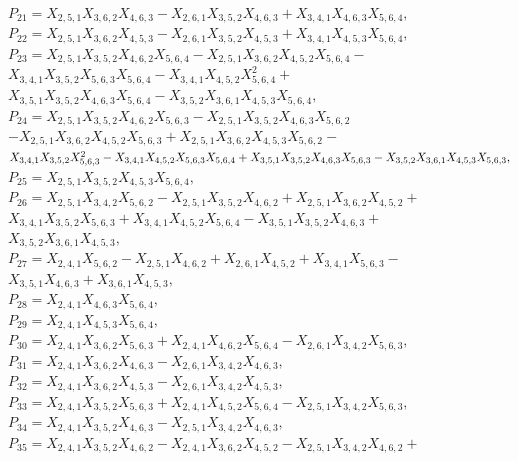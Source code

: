 \documentclass[10pt]{beamer}
\begin{document}
{$P_{21}=X_{2,5,1}X_{3,6,2}X_{4,6,3}-X_{2,6,1}X_{3,5,2}X_{4,6,3}+X_{3,4,1}X_{4,6,3}X_{5,6,4},$\\
$P_{22}=X_{2,5,1}X_{3,6,2}X_{4,5,3}-X_{2,6,1}X_{3,5,2}X_{4,5,3}+X_{3,4,1}X_{4,5,3}X_{5,6,4},$\\
$P_{23}=X_{2,5,1}X_{3,5,2}X_{4,6,2}X_{5,6,4}-X_{2,5,1}X_{3,6,2}X_{4,5,2}X_{5,6,4}-$\\
$X_{3,4,1}X_{3,5,2}X_{5,6,3}X_{5,6,4}-X_{3,4,1}X_{4,5,2}X_{5,6,4}^2+$\\
$X_{3,5,1}X_{3,5,2}X_{4,6,3}X_{5,6,4}-X_{3,5,2}X_{3,6,1}X_{4,5,3}X_{5,6,4},$\\
$P_{24}=X_{2,5,1}X_{3,5,2}X_{4,6,2}X_{5,6,3}-X_{2,5,1}X_{3,5,2}X_{4,6,3}X_{5,6,2}$\\
$-X_{2,5,1}X_{3,6,2}X_{4,5,2}X_{5,6,3}+X_{2,5,1}X_{3,6,2}X_{4,5,3}X_{5,6,2}-$\\
$X_{3,4,1}X_{3,5,2}X_{5,6,3}^2-X_{3,4,1}X_{4,5,2}X_{5,6,3}X_{5,6,4}+\\
X_{3,5,1}X_{3,5,2}X_{4,6,3}X_{5,6,3}-X_{3,5,2}X_{3,6,1}X_{4,5,3}X_{5,6,3},$\\
$P_{25}=X_{2,5,1}X_{3,5,2}X_{4,5,3}X_{5,6,4},$\\
$P_{26}=X_{2,5,1}X_{3,4,2}X_{5,6,2}-X_{2,5,1}X_{3,5,2}X_{4,6,2}+X_{2,5,1}X_{3,6,2}X_{4,5,2}+$\\
$X_{3,4,1}X_{3,5,2}X_{5,6,3}+X_{3,4,1}X_{4,5,2}X_{5,6,4}-X_{3,5,1}X_{3,5,2}X_{4,6,3}+$\\
$X_{3,5,2}X_{3,6,1}X_{4,5,3},$\\
$P_{27}=X_{2,4,1}X_{5,6,2}-X_{2,5,1}X_{4,6,2}+X_{2,6,1}X_{4,5,2}+X_{3,4,1}X_{5,6,3}-$\\
$X_{3,5,1}X_{4,6,3}+X_{3,6,1}X_{4,5,3},$\\
$P_{28}=X_{2,4,1}X_{4,6,3}X_{5,6,4},$\\
$P_{29}=X_{2,4,1}X_{4,5,3}X_{5,6,4},$\\
$P_{30}=X_{2,4,1}X_{3,6,2}X_{5,6,3}+X_{2,4,1}X_{4,6,2}X_{5,6,4}-X_{2,6,1}X_{3,4,2}X_{5,6,3},$\\
$P_{31}=X_{2,4,1}X_{3,6,2}X_{4,6,3}-X_{2,6,1}X_{3,4,2}X_{4,6,3},$\\
$P_{32}=X_{2,4,1}X_{3,6,2}X_{4,5,3}-X_{2,6,1}X_{3,4,2}X_{4,5,3},$\\
$P_{33}=X_{2,4,1}X_{3,5,2}X_{5,6,3}+X_{2,4,1}X_{4,5,2}X_{5,6,4}-X_{2,5,1}X_{3,4,2}X_{5,6,3},$\\
$P_{34}=X_{2,4,1}X_{3,5,2}X_{4,6,3}-X_{2,5,1}X_{3,4,2}X_{4,6,3},$\\
$P_{35}=X_{2,4,1}X_{3,5,2}X_{4,6,2}-X_{2,4,1}X_{3,6,2}X_{4,5,2}-X_{2,5,1}X_{3,4,2}X_{4,6,2}+$\\
}
\end{document}

